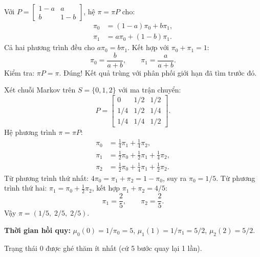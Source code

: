 \begin{example}
\label{ex:stationary-two-state}
Với $P = \begin{bmatrix} 1-a & a \\ b & 1-b \end{bmatrix}$,
hệ $\pi = \pi P$ cho:
\begin{align*}
  \pi_0 &= (1-a)\pi_0 + b\pi_1, \\
  \pi_1 &= a\pi_0 + (1-b)\pi_1.
\end{align*}
Cả hai phương trình đều cho $a\pi_0 = b\pi_1$.
Kết hợp với $\pi_0 + \pi_1 = 1$:
\[
  \pi_0 = \frac{b}{a+b}, \qquad \pi_1 = \frac{a}{a+b}.
\]
Kiểm tra: $\pi P = \pi$. Đúng! Kết quả trùng với phân phối giới hạn đã tìm trước đó.
\end{example}

\begin{example}
\label{ex:stationary-three-state}
Xét chuỗi Markov trên $S = \{0, 1, 2\}$ với ma trận chuyển:
\[
  P = \begin{bmatrix}
    0 & 1/2 & 1/2 \\
    1/4 & 1/2 & 1/4 \\
    1/4 & 1/4 & 1/2
  \end{bmatrix}.
\]
Hệ phương trình $\pi = \pi P$:
\begin{align*}
  \pi_0 &= \tfrac{1}{4}\pi_1 + \tfrac{1}{4}\pi_2, \\
  \pi_1 &= \tfrac{1}{2}\pi_0 + \tfrac{1}{2}\pi_1 + \tfrac{1}{4}\pi_2, \\
  \pi_2 &= \tfrac{1}{2}\pi_0 + \tfrac{1}{4}\pi_1 + \tfrac{1}{2}\pi_2.
\end{align*}
Từ phương trình thứ nhất: $4\pi_0 = \pi_1 + \pi_2 = 1 - \pi_0$, suy ra $\pi_0 = 1/5$.
Từ phương trình thứ hai: $\pi_1 = \pi_0 + \tfrac{1}{2}\pi_2$, kết hợp $\pi_1 + \pi_2 = 4/5$:
\[
  \pi_1 = \frac{2}{5}, \qquad \pi_2 = \frac{2}{5}.
\]
Vậy $\pi = (1/5,\; 2/5,\; 2/5)$.

\textbf{Thời gian hồi quy:} $\mu_0(0) = 1/\pi_0 = 5$, $\mu_1(1) = 1/\pi_1 = 5/2$, $\mu_2(2) = 5/2$.

Trạng thái 0 được ghé thăm ít nhất (cứ 5 bước quay lại 1 lần).
\end{example}

